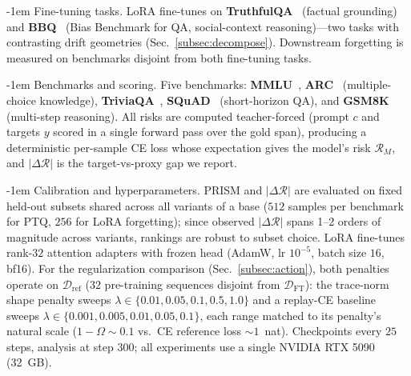 \documentclass{article}
\makeatletter
\newlength{\paraSpace}
\renewcommand{\paragraph}{\@startsection{paragraph}{4}{\z@}%
  {\paraSpace}{-1em}%
  {\normalfont\normalsize\bfseries}}
\makeatother
\begin{document}
\paragraph{Fine-tuning tasks.}
LoRA fine-tunes on \textbf{TruthfulQA}~\cite{lin2022truthfulqa} (factual grounding) and \textbf{BBQ}~\cite{parrish2022bbq} (Bias Benchmark for QA, social-context reasoning)---two tasks with contrasting drift geometries (Sec.~\ref{subsec:decompose}). Downstream forgetting is measured on benchmarks disjoint from both fine-tuning tasks.

\paragraph{Benchmarks and scoring.}
Five benchmarks: \textbf{MMLU}~\cite{hendrycks2021measuring}, \textbf{ARC}~\cite{clark2018think} (multiple-choice knowledge), \textbf{TriviaQA}~\cite{joshi2017triviaqa}, \textbf{SQuAD}~\cite{rajpurkar2016squad} (short-horizon QA), and \textbf{GSM8K}~\cite{cobbe2021training} (multi-step reasoning). All risks are computed teacher-forced (prompt $c$ and targets $y$ scored in a single forward pass over the gold span), producing a deterministic per-sample CE loss whose expectation gives the model's risk $\mathcal{R}_M$, and $|\Delta\mathcal{R}|$ is the target-vs-proxy gap we report.

\paragraph{Calibration and hyperparameters.}
PRISM and $|\Delta\mathcal{R}|$ are evaluated on fixed held-out subsets shared across all variants of a base ($512$ samples per benchmark for PTQ, $256$ for LoRA forgetting); since observed $|\Delta\mathcal{R}|$ spans 1--2 orders of magnitude across variants, rankings are robust to subset choice. LoRA fine-tunes rank-$32$ attention adapters with frozen head (AdamW, lr $10^{-5}$, batch size $16$, bf16). For the regularization comparison (Sec.~\ref{subsec:action}), both penalties operate on $\mathcal{D}_{\mathrm{ref}}$ ($32$ pre-training sequences disjoint from $\mathcal{D}_{\mathrm{FT}}$): the trace-norm shape penalty sweeps $\lambda \in \{0.01, 0.05, 0.1, 0.5, 1.0\}$ and a replay-CE baseline sweeps $\lambda \in \{0.001, 0.005, 0.01, 0.05, 0.1\}$, each range matched to its penalty's natural scale ($1{-}\Omega \sim 0.1$ vs.\ CE reference loss $\sim 1$~nat). Checkpoints every $25$ steps, analysis at step $300$; all experiments use a single NVIDIA RTX 5090 (32~GB).
\end{document}
